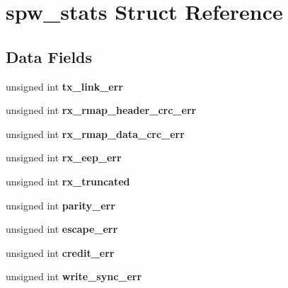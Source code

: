 \hypertarget{structspw__stats}{}\section{spw\+\_\+stats Struct Reference}
\label{structspw__stats}
\subsection*{Data Fields}
\begin{DoxyCompactItemize}
\item 
\mbox{\label{structspw__stats_a8cda5ed19e4b6da8d62066c3a8c9a179}} 
unsigned int {\bfseries tx\+\_\+link\+\_\+err}
\item 
\mbox{\label{structspw__stats_a6408ad7a4bb35bae54a2a9bf317fe84c}} 
unsigned int {\bfseries rx\+\_\+rmap\+\_\+header\+\_\+crc\+\_\+err}
\item 
\mbox{\label{structspw__stats_a03209df75e4d49fe4e268e2f8a998e2b}} 
unsigned int {\bfseries rx\+\_\+rmap\+\_\+data\+\_\+crc\+\_\+err}
\item 
\mbox{\label{structspw__stats_a8432fe0f12f42bad90087202cb27aa50}} 
unsigned int {\bfseries rx\+\_\+eep\+\_\+err}
\item 
\mbox{\label{structspw__stats_a1d232326edbd5b5642f8732619b9bf92}} 
unsigned int {\bfseries rx\+\_\+truncated}
\item 
\mbox{\label{structspw__stats_ac8c4a21c579b6852498395630fc8567b}} 
unsigned int {\bfseries parity\+\_\+err}
\item 
\mbox{\label{structspw__stats_a801029c3ce30e296aa64b617900ed864}} 
unsigned int {\bfseries escape\+\_\+err}
\item 
\mbox{\label{structspw__stats_a6313f90c39e39818d51770824360c391}} 
unsigned int {\bfseries credit\+\_\+err}
\item 
\mbox{\label{structspw__stats_a18b93f638e3935b8cd56fe57ff4d176e}} 
unsigned int {\bfseries write\+\_\+sync\+\_\+err}
\item 

\end{DoxyCompactItemize}

